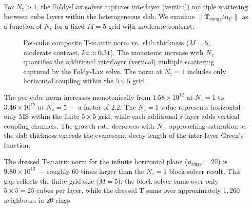 \documentclass[11pt,a4paper]{article}
\theoremstyle{plain}
\theoremstyle{remark}
\begin{document}
For $N_z > 1$, the Foldy-Lax solver captures interlayer (vertical)
multiple scattering between cube layers within the heterogeneous slab.
We examine $\|\mathbf{T}_{\mathrm{comp}} / n_C\|$ as a function of
$N_z$ for a fixed $M = 5$ grid with moderate contrast.

\begin{figure}[ht]
\centering
{}
\caption{Per-cube composite T-matrix norm vs.\ slab thickness ($M = 5$,
moderate contrast, $ka \approx 0.31$).  The monotonic increase with
$N_z$ quantifies the additional interlayer (vertical) multiple
scattering captured by the Foldy-Lax solve.  The norm at $N_z = 1$
includes only horizontal coupling within the $5 \times 5$ grid.}
\label{fig:thickness}
\end{figure}

The per-cube norm increases monotonically from $1.58 \times 10^{12}$ at
$N_z = 1$ to $3.46 \times 10^{12}$ at $N_z = 5$ --- a factor of 2.2.
The $N_z = 1$ value represents horizontal-only MS within the finite
$5 \times 5$ grid, while each additional z-layer adds vertical coupling
channels.  The growth rate decreases with $N_z$, approaching saturation
as the slab thickness exceeds the evanescent decay length of the
inter-layer Green's function.

The dressed T-matrix norm for the infinite horizontal plane
($n_{\mathrm{rings}} = 20$) is $9.80 \times 10^{13}$ --- roughly 60
times larger than the $N_z = 1$ block solver result.  This gap reflects
the finite grid size ($M = 5$): the block solver sums over only
$5 \times 5 = 25$ cubes per layer, while the dressed T sums over
approximately $1{,}260$ neighbours in 20 rings.

\end{document}
